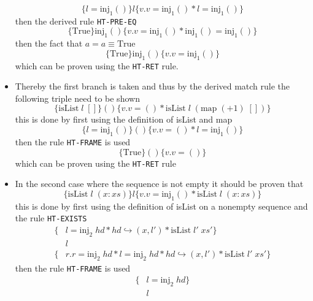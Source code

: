 \begin{itemize}
\begin{equation*}
    \{l = \text{inj}_1()\} l \{v.v = \text{inj}_1() * l = \text{inj}_1()\}
  \end{equation*}
  then the derived rule \texttt{HT-PRE-EQ}
  \begin{equation*}
    \{\text{True}\} \text{inj}_1() \{v.v = \text{inj}_1() * \text{inj}_1() = \text{inj}_1()\}
  \end{equation*}
  then the fact that $a = a \equiv \text{True}$
  \begin{equation*}
    \{\text{True}\} \text{inj}_1() \{v.v = \text{inj}_1()\}
  \end{equation*}
  which can be proven using the \texttt{HT-RET} rule.
  \item Thereby the first branch is taken and thus by the derived match rule the following triple need to be shown
  \begin{equation*}
    \{\text{isList}\; l \; []\} () \{v.v = () * \text{isList} \; l \; (\text{map} \; (+1) \; [])\}
  \end{equation*}
  this is done by first using the definition of isList and map
  \begin{equation*}
    \{l = \text{inj}_1()\} () \{v.v = () * l = \text{inj}_1()\}
  \end{equation*}
  then the rule \texttt{HT-FRAME} is used
  \begin{equation*}
    \{\text{True}\} () \{v.v = ()\}
  \end{equation*}
  which can be proven using the \texttt{HT-RET} rule
  \item In the second case where the sequence is not empty it should be proven that 
  \begin{equation*}
    \{\text{isList} \; l \; (x : xs)\} l \{v.v = \text{inj}_1() * \text{isList} \; l \; (x: xs)\}
  \end{equation*}
  this is done by first using the definition of isList on a nonempty sequence and the rule \texttt{HT-EXISTS}
  \begin{align*}
    \{&l = \text{inj}_2 \; hd * hd \hookrightarrow (x, l') * \text{isList} \; l' \; xs' \} \\
        &l \\
    \{&r.r = \text{inj}_2 \; hd * l = \text{inj}_2 \; hd * hd \hookrightarrow (x, l') * \text{isList} \; l' \; xs' \} 
  \end{align*}
  then the rule \texttt{HT-FRAME} is used 
  \begin{align*}
    \{&l = \text{inj}_2 \; hd \} \\
        &l \\

\end{align*}
\end{itemize}
